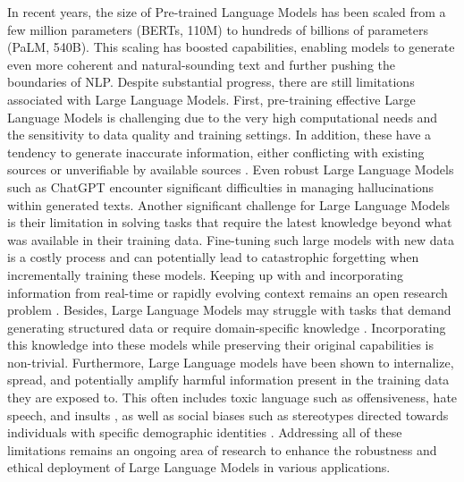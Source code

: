 In recent years, the size of Pre-trained Language Models has been scaled from a few million parameters (\acp{BERT}, 110M) to hundreds of billions of parameters (PaLM, 540B). This scaling has boosted capabilities, enabling models to generate even more coherent and natural-sounding text and further pushing the boundaries of \ac{NLP}. Despite substantial progress, there are still limitations associated with Large Language Models. First, pre-training effective Large Language Models is challenging due to the very high computational needs and the sensitivity to data quality and training settings. In addition, these have a tendency to generate inaccurate information, either conflicting with existing sources or unverifiable by available sources \citep{bang2023multitask}. Even robust Large Language Models such as ChatGPT encounter significant difficulties in managing hallucinations within generated texts. Another significant challenge for Large Language Models is their limitation in solving tasks that require the latest knowledge beyond what was available in their training data. Fine-tuning such large models with new data is a costly process and can potentially lead to catastrophic forgetting when incrementally training these models. Keeping up with and incorporating information from real-time or rapidly evolving context remains an open research problem \citep{yao2023editing}. Besides, Large Language Models may struggle with tasks that demand generating structured data \citep{jiang2023structgpt} or require domain-specific knowledge \citep{ye2023comprehensive}. Incorporating this knowledge into these models while preserving their original capabilities is non-trivial. Furthermore, Large Language models have been shown to internalize, spread, and potentially amplify harmful information present in the training data they are exposed to. This often includes toxic language such as offensiveness, hate speech, and insults \citep{gehman2020realtoxicityprompts}, as well as social biases such as stereotypes directed towards individuals with specific demographic identities \citep{sheng2021societal}. Addressing all of these limitations remains an ongoing area of research to enhance the robustness and ethical deployment of Large Language Models in various applications.




